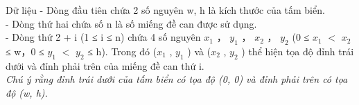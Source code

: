 Dữ liệu
- Dòng đầu tiên chứa 2 số nguyên w, h là kích thước của tấm biển.   
\\   - Dòng thứ hai chứa số n là số miếng đề can được sử dụng.   
\\   - Dòng thứ 2 + i (1 ≤ i ≤ n) chứa 4 số nguyên $x_{1}$   ， $y_{1}$   ， $x_{2}$   ， $y_{2}$   (0 ≤ $x_{1}$   $<$ $x_{2}$   ≤ w，0 ≤ $y_{1}$   $<$ $y_{2}$   ≤ h). Trong đó ($x_{1}$   , $y_{1}$   ) và ($x_{2}$   , $y_{2}$   ) thể hiện tọa độ đỉnh trái dưới và đỉnh phải trên của miếng đề can thứ i.   
\\\textit{     Chú ý rằng đỉnh trái dưới của tấm biển có tọa độ (0, 0) và đỉnh phải trên có tọa độ (w, h).    }